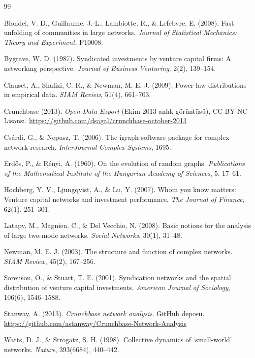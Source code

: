 \documentclass[12pt,a4paper]{article}
\begin{document}
\newpage
\begin{thebibliography}{99}
\setlength{\itemsep}{4pt}

Blondel, V. D., Guillaume, J.-L., Lambiotte, R., \& Lefebvre, E. (2008). Fast unfolding of communities in large networks. \textit{Journal of Statistical Mechanics: Theory and Experiment}, P10008.

Bygrave, W. D. (1987). Syndicated investments by venture capital firms: A networking perspective. \textit{Journal of Business Venturing}, 2(2), 139--154.

Clauset, A., Shalizi, C. R., \& Newman, M. E. J. (2009). Power-law distributions in empirical data. \textit{SIAM Review}, 51(4), 661--703.

Crunchbase (2013). \textit{Open Data Export} (Ekim 2013 anlık görüntüsü), CC-BY-NC Lisansı. \url{https://github.com/dsagal/crunchbase-october-2013}

Csárdi, G., \& Nepusz, T. (2006). The igraph software package for complex network research. \textit{InterJournal Complex Systems}, 1695.

Erdős, P., \& Rényi, A. (1960). On the evolution of random graphs. \textit{Publications of the Mathematical Institute of the Hungarian Academy of Sciences}, 5, 17--61.

Hochberg, Y. V., Ljungqvist, A., \& Lu, Y. (2007). Whom you know matters: Venture capital networks and investment performance. \textit{The Journal of Finance}, 62(1), 251--301.

Latapy, M., Magnien, C., \& Del Vecchio, N. (2008). Basic notions for the analysis of large two-mode networks. \textit{Social Networks}, 30(1), 31--48.

Newman, M. E. J. (2003). The structure and function of complex networks. \textit{SIAM Review}, 45(2), 167--256.

Sorenson, O., \& Stuart, T. E. (2001). Syndication networks and the spatial distribution of venture capital investments. \textit{American Journal of Sociology}, 106(6), 1546--1588.

Stanway, A. (2013). \textit{Crunchbase network analysis}. GitHub deposu. \url{https://github.com/astanway/Crunchbase-Network-Analysis}

Watts, D. J., \& Strogatz, S. H. (1998). Collective dynamics of `small-world' networks. \textit{Nature}, 393(6684), 440--442.

\end{thebibliography}
\end{document}
